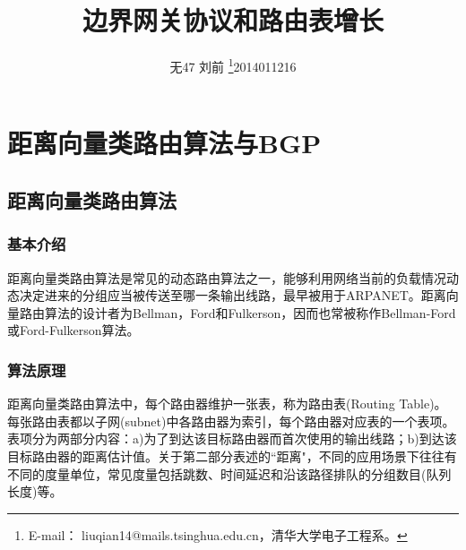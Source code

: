 \documentclass[11pt,twocolumn]{article}
\begin{document}
\title{\textbf{边界网关协议和路由表增长}}
\author{无47 \hspace{2em} 刘前 \thanks{E-mail： liuqian14@mails.tsinghua.edu.cn，清华大学电子工程系。}\hspace{2em}2014011216}

\maketitle



\section{距离向量类路由算法与BGP}
\subsection{距离向量类路由算法}

\subsubsection{基本介绍}
距离向量类路由算法是常见的动态路由算法之一，能够利用网络当前的负载情况动态决定进来的分组应当被传送至哪一条输出线路，最早被用于ARPANET\cite{CN}。距离向量路由算法的设计者为Bellman，Ford和Fulkerson，因而也常被称作Bellman-Ford或Ford-Fulkerson算法。

\subsubsection{算法原理}
距离向量类路由算法中，每个路由器维护一张表，称为路由表(Routing Table)。每张路由表都以子网(subnet)中各路由器为索引，每个路由器对应表的一个表项。表项分为两部分内容：a)为了到达该目标路由器而首次使用的输出线路；b)到达该目标路由器的距离估计值。关于第二部分表述的``距离"，不同的应用场景下往往有不同的度量单位，常见度量包括跳数、时间延迟和沿该路径排队的分组数目(队列长度)等\cite{CN}。
\end{document}
